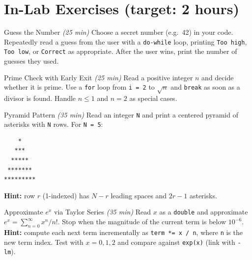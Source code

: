 \documentclass[11pt]{article}
\begin{document}
\section*{In-Lab Exercises (target: 2 hours)}

\begin{labexercise}{Guess the Number \hfill {\small \itshape (25 min)}}
Choose a secret number (e.g.\ 42) in your code. Repeatedly read a guess from the user
with a \texttt{do-while} loop, printing \texttt{Too high}, \texttt{Too low}, or
\texttt{Correct} as appropriate. After the user wins, print the number of guesses they used.
\end{labexercise}

\begin{labexercise}{Prime Check with Early Exit \hfill {\small \itshape (25 min)}}
Read a positive integer $n$ and decide whether it is prime. Use a \texttt{for} loop
from \texttt{i = 2} to $\sqrt{n}$ and \texttt{break} as soon as a divisor is found.
Handle $n \leq 1$ and $n = 2$ as special cases.
\end{labexercise}

\begin{labexercise}{Pyramid Pattern \hfill {\small \itshape (35 min)}}
Read an integer \texttt{N} and print a centered pyramid of asterisks with \texttt{N} rows.
For \texttt{N = 5}:
\begin{lstlisting}
    *
   ***
  *****
 *******
*********
\end{lstlisting}
\textbf{Hint:} row $r$ (1-indexed) has $N - r$ leading spaces and $2r - 1$ asterisks.
\end{labexercise}

\begin{labexercise}{Approximate $e^x$ via Taylor Series \hfill {\small \itshape (35 min)}}
Read $x$ as a \texttt{double} and approximate $e^{x}= \sum_{n=0}^{\infty} x^{n}/n!$.
Stop when the magnitude of the current term is below $10^{-6}$.
\textbf{Hint:} compute each next term incrementally as \texttt{term *= x / n}, where \texttt{n}
is the new term index. Test with $x = 0, 1, 2$ and compare against \texttt{exp(x)} (link with \texttt{-lm}).
\end{labexercise}
\end{document}
